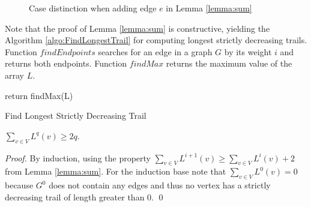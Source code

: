 \begin{isabellebody}
\begin{isamarkuptext}
\begin{figure}[h]
	\caption{Case distinction when adding edge $e$ in Lemma \ref{lemma:sum}}\label{figure:cases}
\end{figure}
			

\noindent Note that the proof of Lemma \ref{lemma:sum} is constructive, yielding the Algorithm \ref{algo:FindLongestTrail} for computing
longest strictly decreasing trails. Function $findEndpoints$ searches for an edge in a graph $G$ by its weight $i$ and returns
both endpoints. Function $findMax$ returns the maximum value of the array $L$. 

\begin{algorithm}[H]
	\SetAlgoLined
	

	return findMax(L)\;

\caption{Find Longest Strictly Decreasing Trail}\label{algo:FindLongestTrail}
\end{algorithm}

\begin{lemma}$\sum_{v\in V} L^{q}(v) \ge 2q$. \end{lemma}

\begin{proof}
By induction, using the property $\sum_{v\in V} L^{i+1}(v) \ge \sum_{v\in V} L^{i}(v)+2$ from Lemma \ref{lemma:sum}. For the induction base note that $\sum_{v\in V} L^{0}(v) = 0$ 
because $G^0$ does not contain any edges and thus no vertex has a strictly decreasing trail of length greater than 0. \qed \end{proof}


\end{isamarkuptext}
\end{isabellebody}
